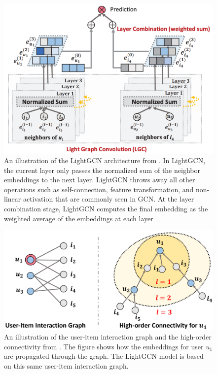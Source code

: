 \documentclass{article}
\begin{document}
\begin{figure}
    \centering
    \includegraphics[width=.8\textwidth]{figs/light-gcn-architecture.png}
    \caption{An illustration of the LightGCN architecture from \cite{lightgcn}. In LightGCN, the current layer only passes the normalized sum of the neighbor embeddings to the next layer. LightGCN throws away all other operations such as self-connection, feature transformation, and non-linear activation that are commonly seen in GCN. At the layer combination stage, LightGCN computes the final embedding as the weighted average of the embeddings at each layer}
    \label{fig:light-gcn-architecture}
\end{figure}

\begin{figure}
    \centering
    \includegraphics[width=.8\textwidth]{figs/ngcf-architecture.png}
    \caption{An illustration of the user-item interaction graph and the high-order connectivity from \cite{ngcf}. The figure shows how the embeddings for user $u_1$ are propagated through the graph. The LightGCN model is based on this same user-item interaction graph.}
    \label{fig:user-item-interact-graph}
\end{figure}
\end{document}
